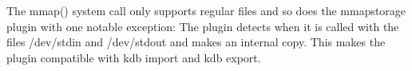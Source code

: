The {\ttfamily mmap()} system call only supports regular files and so does the mmapstorage plugin with one notable exception\+: The plugin detects when it is called with the files {\ttfamily /dev/stdin} and {\ttfamily /dev/stdout} and makes an internal copy. This makes the plugin compatible with {\ttfamily kdb import} and {\ttfamily kdb export}. 